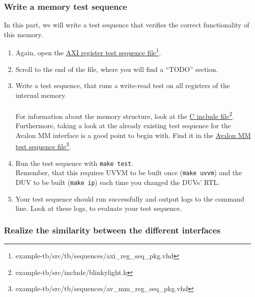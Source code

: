 \subsubsection{Write a memory test sequence}

In this part, we will write a test sequence that verifies the correct functionality of this memory.

\begin{enumerate}
      \item Again, open the \href{../../example-tb/src/tb/sequences/axi\_reg\_seq\_pkg.vhd} {AXI register test sequence file}\footnote{example-tb/src/tb/sequences/axi\_reg\_seq\_pkg.vhd}.
      \item Scroll to the end of the file, where you will find a ``TODO'' section.
      \item Write a test sequence, that runs a write-read test on all registers of the internal memory. \\
            \\
            For information about the memory structure, look at the \href{example-tb/src/include/blinkylight.h}{C include file}\footnote{example-tb/src/include/blinkylight.h}.\\
            Furthermore, taking a look at the already existing test sequence for the Avalon MM interface is a good point to begin with. Find it in the \href{example-tb/src/tb/sequences/av\_mm\_reg\_seq\_pkg.vhd}{Avalon MM test sequence file}\footnote{example-tb/src/tb/sequences/av\_mm\_reg\_seq\_pkg.vhd}.

      \item Run the test sequence with \texttt{make test}.\\
            Remember, that this requires UVVM to be built once (\texttt{make uvvm}) and the DUV to be built (\texttt{make ip}) each time you changed the DUVs' RTL.

      \item Your test sequence should run successfully and output logs to the command line. Look at these logs, to evaluate your test sequence.
\end{enumerate}

\subsubsection{Realize the similarity between the different interfaces}

